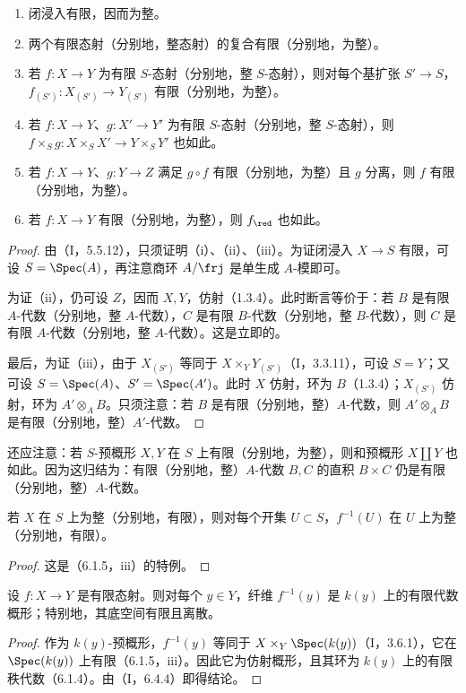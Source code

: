 \begin{enumerate}[label=\textup{(\roman*)}]
\item 闭浸入有限，因而为整。
\item 两个有限态射（分别地，整态射）的复合有限（分别地，为整）。
\item 若 $f:X\to Y$ 为有限 $S$-态射（分别地，整 $S$-态射），则对每个基扩张 $S'\to S$，$f_{(S')}:X_{(S')}\to Y_{(S')}$ 有限（分别地，为整）。
\item 若 $f:X\to Y$、$g:X'\to Y'$ 为有限 $S$-态射（分别地，整 $S$-态射），则 $f\times_Sg:X\times_S X'\to Y\times_S Y'$ 也如此。
\item 若 $f:X\to Y$、$g:Y\to Z$ 满足 $g\circ f$ 有限（分别地，为整）且 $g$ 分离，则 $f$ 有限（分别地，为整）。
\item 若 $f:X\to Y$ 有限（分别地，为整），则 $f_{\red}$ 也如此。
\end{enumerate}
\begin{proof}
由（I，5.5.12），只须证明（i）、（ii）、（iii）。为证闭浸入 $X\to S$ 有限，可设 $S=\Spec(A)$，再注意商环 $A/\frj$ 是单生成 $A$-模即可。

为证（ii），仍可设 $Z$，因而 $X,Y$，仿射（1.3.4）。此时断言等价于：若 $B$ 是有限 $A$-代数（分别地，整 $A$-代数），$C$ 是有限 $B$-代数（分别地，整 $B$-代数），则 $C$ 是有限 $A$-代数（分别地，整 $A$-代数）。这是立即的。

最后，为证（iii），由于 $X_{(S')}$ 等同于 $X\times_Y Y_{(S')}$（I，3.3.11），可设 $S=Y$；又可设 $S=\Spec(A)$、$S'=\Spec(A')$。此时 $X$ 仿射，环为 $B$（1.3.4）；$X_{(S')}$ 仿射，环为 $A'\otimes_A B$。只须注意：若 $B$ 是有限（分别地，整）$A$-代数，则 $A'\otimes_A B$ 是有限（分别地，整）$A'$-代数。
\end{proof}
还应注意：若 $S$-预概形 $X,Y$ 在 $S$ 上有限（分别地，为整），则和预概形 $X\amalg Y$ 也如此。因为这归结为：有限（分别地，整）$A$-代数 $B,C$ 的直积 $B\times C$ 仍是有限（分别地，整）$A$-代数。

若 $X$ 在 $S$ 上为整（分别地，有限），则对每个开集 $U\subset S$，$f^{-1}(U)$ 在 $U$ 上为整（分别地，有限）。
\begin{proof}
这是（6.1.5，iii）的特例。
\end{proof}

设 $f:X\to Y$ 是有限态射。则对每个 $y\in Y$，纤维 $f^{-1}(y)$ 是 $k(y)$ 上的有限代数概形；特别地，其底空间有限且离散。
\begin{proof}
作为 $k(y)$-预概形，$f^{-1}(y)$ 等同于 $X\times_Y\Spec(k(y))$（I，3.6.1），它在 $\Spec(k(y))$ 上有限（6.1.5，iii）。因此它为仿射概形，且其环为 $k(y)$ 上的有限秩代数（6.1.4）。由（I，6.4.4）即得结论。
\end{proof}

